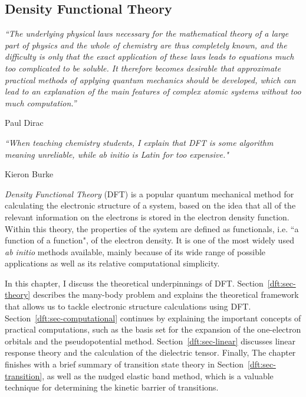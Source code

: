 \begin{refsection} 
 
\chapter{Density Functional Theory} \label{chapter:dft}
 
\setlength{\epigraphwidth}{4in} 
\epigraph{\textit{``The underlying physical laws necessary for the 
mathematical theory of a large part of physics and the whole of chemistry are 
thus completely known, and the difficulty is only that the exact application 
of these laws leads to equations much too complicated to be soluble. It 
therefore becomes desirable that approximate practical methods of applying 
quantum mechanics should be developed, which can lead to an explanation of the 
main features of complex atomic systems without too much computation.''}}{Paul 
Dirac} 
\vspace{2em} 
 
\setlength{\epigraphwidth}{4in} 
\epigraph{\textit{``When teaching chemistry students, I explain that DFT is 
some algorithm meaning unreliable, while ab initio is Latin for too 
expensive."}}{Kieron Burke} 
\vspace{3em} 
 
\textit{Density Functional Theory} (DFT) is a popular quantum mechanical 
method for calculating the electronic structure of a system, based on the idea 
that all of the relevant information on the electrons is stored in the 
electron density function. Within this theory, the properties of the system 
are defined as functionals, i.e. ``a function of a function", of the electron 
density. It is one of the most widely used \textit{ab initio} methods 
available, mainly because of its wide range of possible applications as well 
as its relative computational simplicity.  
 
In this chapter, I discuss the theoretical underpinnings of DFT. 
Section~\ref{dft:sec-theory} describes the many-body problem and explains the 
theoretical framework that allows us to tackle electronic structure 
calculations using DFT. Section~\ref{dft:sec-computational} continues by 
explaining the important concepts of practical computations, such as the basis
set for the expansion of the one-electron orbitals and the pseudopotential method. 
Section~\ref{dft:sec-linear} discusses 
linear response theory and the calculation of the dielectric tensor. Finally, 
The chapter finishes with a brief summary of transition state theory in 
Section~\ref{dft:sec-transition}, as well as the nudged elastic band method, 
which is a valuable technique for determining the kinetic barrier of 
transitions.  
 

\end{refsection}
